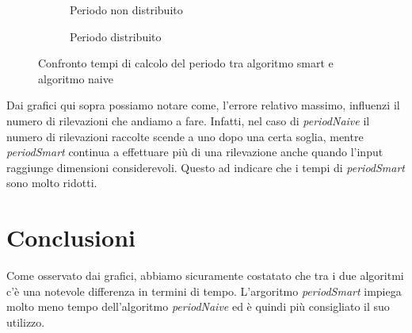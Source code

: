\documentclass[a4paper,titlepage]{article}
\begin{document}
\begin{figure}[h]
  \centering
  \begin{subfigure}{\textwidth}
    \captionsetup{justification=centering}
     \caption{Periodo non distribuito}
     \label{fig:smart_naive_log_fill}
  \end{subfigure}%
  \vspace{2pt}
  \begin{subfigure}{\textwidth}
    \captionsetup{justification=centering}
    \caption{Periodo distribuito}
     \label{fig:smart_naive_log_dist_fill}
  \end{subfigure}
  \caption{Confronto tempi di calcolo del periodo tra algoritmo smart e algoritmo naive}
\end{figure}

Dai grafici qui sopra possiamo notare come, l’errore relativo massimo, influenzi il numero di rilevazioni che andiamo a fare.
Infatti, nel caso di \textit{periodNaive} il numero di rilevazioni raccolte scende a uno dopo una certa soglia, mentre \textit{periodSmart} continua a effettuare più di una rilevazione anche quando l’input raggiunge dimensioni considerevoli.
Questo ad indicare che i tempi di \textit{periodSmart} sono molto ridotti.
\newpage

\section{Conclusioni}

Come osservato dai grafici, abbiamo sicuramente costatato che tra i due algoritmi c’è una notevole differenza in termini di tempo.
L’argoritmo \textit{periodSmart} impiega molto meno tempo dell'algoritmo \textit{periodNaive}  ed è quindi più consigliato il suo utilizzo.
\end{document}
